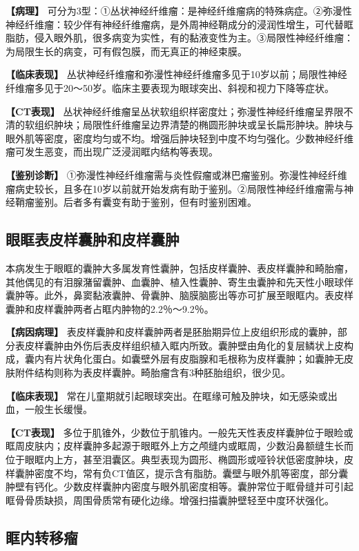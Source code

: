 \textbf{【病理】}
可分为3型：①丛状神经纤维瘤：是神经纤维瘤病的特殊病症。②弥漫性神经纤维瘤：较少伴有神经纤维瘤病，是外周神经鞘成分的浸润性增生，可代替眶脂肪，侵入眼外肌，很多病变为实性，有的黏液变性为主。③局限性神经纤维瘤：为局限生长的病变，可有假包膜，而无真正的神经束膜。

\textbf{【临床表现】}
丛状神经纤维瘤和弥漫性神经纤维瘤多见于10岁以前；局限性神经纤维瘤多见于20～50岁。临床主要表现为眼球突出、斜视和视力下降等症状。

\textbf{【CT表现】}
丛状神经纤维瘤呈丛状软组织样密度灶；弥漫性神经纤维瘤呈界限不清的软组织肿块；局限性纤维瘤呈边界清楚的椭圆形肿块或呈长扁形肿块。肿块与眼外肌等密度，密度均匀或不均。增强后肿块轻到中度不均匀强化。少数神经纤维瘤可发生恶变，而出现广泛浸润眶内结构等表现。

\textbf{【鉴别诊断】}
①弥漫性神经纤维瘤需与炎性假瘤或淋巴瘤鉴别。弥漫性神经纤维瘤病史较长，且多在10岁以前就开始发病有助于鉴别。②局限性神经纤维瘤需与神经鞘瘤鉴别。后者多有囊变有助于鉴别，但有时鉴别困难。

\subsection{眼眶表皮样囊肿和皮样囊肿}

本病发生于眼眶的囊肿大多属发育性囊肿，包括皮样囊肿、表皮样囊肿和畸胎瘤，其他偶见的有泪腺潴留囊肿、血囊肿、植入性囊肿、寄生虫囊肿和先天性小眼球伴囊肿等。此外，鼻窦黏液囊肿、骨囊肿、脑膜脑膨出等亦可扩展至眼眶内。表皮样囊肿和皮样囊肿两者占眶内肿物的2.2％～9.2％。

\textbf{【病因病理】}
表皮样囊肿和皮样囊肿两者是胚胎期异位上皮组织形成的囊肿，部分表皮样囊肿由外伤后表皮样组织植入眶内所致。囊肿壁由角化的复层鳞状上皮构成，囊内有片状角化蛋白。如囊壁外层有皮脂腺和毛根称为皮样囊肿；如囊肿无皮肤附件结构则称为表皮样囊肿。畸胎瘤含有3种胚胎组织，很少见。

\textbf{【临床表现】}
常在儿童期就引起眼球突出。在眶缘可触及肿块，如无感染或出血，一般生长缓慢。

\textbf{【CT表现】}
多位于肌锥外，少数位于肌锥内。一般先天性表皮样囊肿位于眼睑或眶周皮肤内；皮样囊肿多起源于眼眶外上方之颅缝内或眶周，少数沿鼻额缝生长而位于眼眶内上方，甚至泪囊区。典型表现为圆形、椭圆形或哑铃状低密度肿块，皮样囊肿密度不均，常有负CT值区，提示含有脂肪。囊壁与眼外肌等密度，部分囊肿壁有钙化。少数皮样囊肿内密度与眼外肌密度相等。囊肿常位于眶骨缝并可引起眶骨骨质缺损，周围骨质常有硬化边缘。增强扫描囊肿壁轻至中度环状强化。

\subsection{眶内转移瘤}


